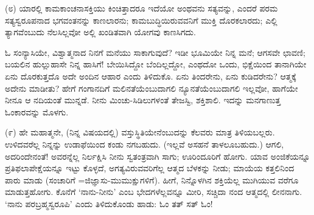 (೮) ಯಾರಲ್ಲಿ ಕಾಮಕಾಂಚನಾಸಕ್ತಿಯು ಕಿಂಚಿತ್ತಾದರೂ ಇದೆಯೋ ಅಂಥವನು ಸತ್ಯವನ್ನು, ಎಂದರೆ ಪರಮ ಸತ್ಯಸ್ವರೂಪನಾದ ಭಗವಂತನನ್ನು ಕಾಣಲಾರನು; ಕಾಮಬುದ್ಧಿಯಿರುವವನಿಗೆ ಮುಕ್ತಿ ದೊರಕಲಾರದು; ಎಲ್ಲಿ ತ್ಯಾಗವೆಂಬುದು ನೆಲಸಿಲ್ಲವೋ ಅಲ್ಲಿ ಖಂಡಿತವಾಗಿ ಯೋಗವು ಕಾಣಸಿಗದು.

ಓ ಸಂನ್ಯಾಸಿಯೇ, ವಿಶ್ವಾತ್ಮನಾದ ನಿನಗೆ ಮನೆಯು ಸಾಕಾಗುವುದೆ? ಇಡೀ ಭೂಮಿಯೇ ನಿನ್ನ ಮನೆ; ಆಗಸವೇ ಛಾವಣಿ; ಬಯಲಿನ ಹುಲ್ಲುಹಾಸೇ ನಿನ್ನ ಹಾಸಿಗೆ! ಬೇಯಿಸಿದ್ದೋ ಬೆಂದಿಲ್ಲದ್ದೋ, ಎಂಥದೋ ಒಂದು, ಭಿಕ್ಷೆಯಿಂದ ತಾನಾಗಿಯೇ ಏನು ದೊರಕುತ್ತದೊ ಅದೇ ಅಂದಿನ ಆಹಾರ ಎಂದು ತಿಳಿದುಕೊ. ಏನು ತಿಂದರೇನು, ಏನು ಕುಡಿದರೇನು? ಆತ್ಮಕ್ಕೆ ಅದೇನು ಮಾಡೀತು? ಹೇಗೆ ಗಂಗಾನದಿಗೆ ಮಲಿನತೆಯೆಂಬುದಾಗಲಿ ನ್ಯೂನತೆಯೆಂಬುದಾಗಲಿ ಇಲ್ಲವೋ, ಹಾಗೆಯೇ ನೀನೂ ಆ ನದಿಯಂತೆ ಮುನ್ನಡೆ. ನೀನು ಮಿಂಚು-ಸಿಡಿಲುಗಳಂತೆ ತೇಜಸ್ವಿ, ಶಕ್ತಿಶಾಲಿ. ಇದನ್ನು ಮನಗಾಣುತ್ತ ಓಂಕಾರವನ್ನು ಮೊಳಗು.

(೯) ಹೇ ಮಹಾತ್ಮನೇ, (ನಿನ್ನ ವಿಷಯದಲ್ಲಿ) ವಸ್ತುಸ್ಥಿತಿಯೇನೆಂಬುದನ್ನು ಕೆಲವರು ಮಾತ್ರ ತಿಳಿಯಬಲ್ಲರು. ಉಳಿದವರೆಲ್ಲ ನಿನ್ನನ್ನು ಉಡಾಫೆಯಿಂದ ಕಂಡು ನಗಬಹುದು. (ಇಲ್ಲವೆ ಅಸಹನೆ ತಾಳಲೂಬಹುದು.) ಆಗಲಿ, ಅದರಿಂದೇನಂತೆ! ಅವರನ್ನೆಲ್ಲ ನಿರ್ಲಕ್ಷಿಸಿ ನೀನು ಸ್ವತಂತ್ರವಾಗಿ ಸಾಗು; ಊರಿಂದೂರಿಗೆ ಹೋಗು. ಯಾವ ಅಂಜಿಕೆಯನ್ನೂ ಪ್ರತಿಫಲಾಪೇಕ್ಷೆಯನ್ನೂ ಇಟ್ಟು ಕೊಳ್ಳದೆ, ಅಗತ್ಯವಿರುವವರಿಗೆಲ್ಲ ಆತ್ಮದ ಬೆಳಕನ್ನು ನೀಡು; ಮಾಯೆಯ ಕತ್ತಲಿನಿಂದ ಪಾರು ಮಾಡು (ಸಂಚಾರಿಗೆ =ಜಿಜ್ಞಾಸು-ಮುಮುಕ್ಷುಗಳಿಗೆ). ಹೀಗೆ, ನಿನ್ನೊಳಗಿನ ಶಕ್ತಿಯೆಲ್ಲ ಮುಗಿಯುವ ವರೆಗೂ ಮಾಡುತ್ತಹೋಗು. ಕೊನೆಗೆ ‘ನಾನು-ನೀನು’ ಎಂಬ ಭೇದಗಳೆಲ್ಲವನ್ನೂ ಮೀರಿ, ಸಚ್ಚಿದಾ ನಂದ ಆತ್ಮದಲ್ಲಿ ಲೀನನಾಗು. ‘ನಾನು ಪರಬ್ರಹ್ಮಸ್ವರೂಪಿ’ ಎಂದು ತಿಳಿದುಕೊಂಡು ಹಾಡು: ಓಂ ತತ್ ಸತ್ ಓಂ!

